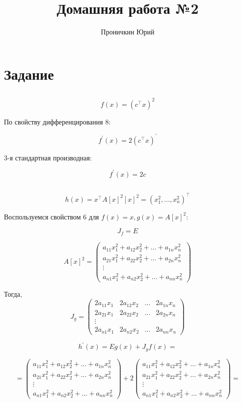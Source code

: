 \documentclass[12pt,a4paper,oneside]{scrartcl}
\begin{document}
\title{Домашняя работа №2}
\author{Проничкин Юрий}
\maketitle

\section{Задание}
\subsection{}

$$f(x) = (c^{\intercal}x)^2$$

По свойству дифференцирования 8:

$$f^{'}(x) = 2(c^{\intercal}x)^{'}$$

3-я стандартная производная:

$$f^{'}(x) = 2c$$

\subsection{}

$$h(x) = x^{\intercal}A[x]^2  [x]^2 = (x_1^2, \dots ,x_n^2)^{\intercal}$$

Воспользуемся свойством 6 для $ f(x) = x, g(x) = A[x]^2$:

$$J_f = E$$

$$A[x]^2 = \begin{pmatrix}
a_{11}x_1^2 + a_{12}x_2^2 + \ldots + a_{1n}x_n^2\\
a_{21}x_1^2 + a_{22}x_2^2 + \ldots + a_{2n}x_n^2\\
\vdots\\
a_{n1}x_1^2 + a_{n2}x_2^2 + \ldots + a_{nn}x_n^2
\end{pmatrix}$$

Тогда, $$J_g = \begin{pmatrix}
2a_{11}x_1 & 2a_{12}x_2 & \ldots & 2a_{1n}x_n\\
2a_{21}x_1 & 2a_{22}x_2 & \ldots & 2a_{2n}x_n\\
\vdots\\
2a_{n1}x_1 & 2a_{n2}x_2 & \ldots & 2a_{nn}x_n
\end{pmatrix}$$

$$h^{'}(x) = Eg(x) + J_gf(x) = $$

$$ = \begin{pmatrix}
a_{11}x_1^2 + a_{12}x_2^2 + \ldots + a_{1n}x_n^2\\
a_{21}x_1^2 + a_{22}x_2^2 + \ldots + a_{2n}x_n^2\\
\vdots\\
a_{n1}x_1^2 + a_{n2}x_2^2 + \ldots + a_{nn}x_n^2
\end{pmatrix} + 2\begin{pmatrix}
a_{11}x_1^2 + a_{12}x_2^2 + \ldots + a_{1n}x_n^2\\
a_{21}x_1^2 + a_{22}x_2^2 + \ldots + a_{2n}x_n^2\\
\vdots\\
a_{n1}x_1^2 + a_{n2}x_2^2 + \ldots + a_{nn}x_n^2
\end{pmatrix} = $$
\end{document}
